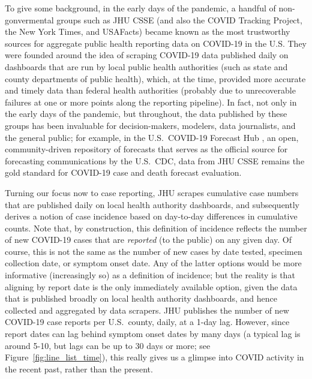 \documentclass[sts]{imsart}
\theoremstyle{plain}
\theoremstyle{definition}
\theoremstyle{remark}
\begin{document}
To give some background, in the early days of the pandemic, a handful of
non-gonvermental groups such as JHU CSSE \citep{Dong:2020} (and also the COVID
Tracking Project, the New York Times, and USAFacts) became known as the most 
trustworthy sources for aggregate public health reporting data on COVID-19 in
the U.S. They were founded around the idea of scraping COVID-19 data published
daily on dashboards that are run by local public health authorities (such as
state and county departments of public health), which, at the time, provided
more accurate and timely data than federal health authorities (probably due to
unrecoverable failures at one or more points along the reporting pipeline). In
fact, not only in the early days of the pandemic, but throughout, the data
published by these groups has been invaluable for decision-makers, modelers,
data journalists, and the general public; for example, in the U.S.\ COVID-19
Forecast Hub \citep{ForecastHub}, an open, community-driven repository of
forecasts that serves as the official source for forecasting communications by
the U.S.\ CDC, data from JHU CSSE remains the gold standard for COVID-19 case
and death forecast evaluation.

Turning our focus now to case reporting, JHU scrapes cumulative case numbers
that are published daily on local health authority dashboards, and subsequently
derives a notion of case incidence based on day-to-day differences in cumulative
counts. Note that, by construction, this definition of incidence reflects the
number of new COVID-19 cases that are \emph{reported} (to the public) on any
given day. Of course, this is not the same as the number of new cases 
by date tested, specimen collection date, or symptom onset date. Any of the
latter options would be more informative (increasingly so) as a definition of 
incidence; but the reality is that aligning by report date is the only
immediately available option, given the data that is published broadly on local
health authority dashboards, and hence collected and aggregated by data
scrapers. JHU publishes the number of new COVID-19 case reports per U.S.\
county, daily, at a 1-day lag. However, since report dates can lag behind
symptom onset dates by many days (a typical lag is around 5-10, but lags can be
up to 30 days or more; see Figure~\ref{fig:line_list_time}), this really gives
us a glimpse into COVID activity in the recent past, rather than the present.
\end{document}
